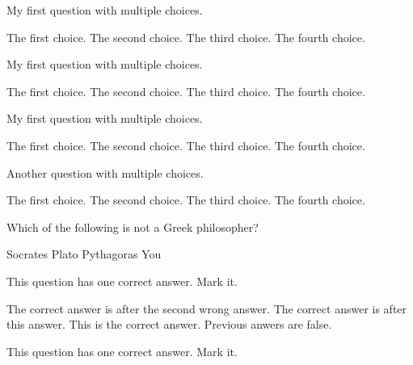 \documentclass{exam}
\begin{document}
\begin{questions}

\question My first question with multiple choices.

\begin{choices}
   \choice The first choice.
   \choice The second choice.
   \choice The third choice.
   \choice The fourth choice.
\end{choices}

\question My first question with multiple choices.

  \begin{oneparchoices}
    \choice The first choice.
    \choice The second choice.
    \choice The third choice.
    \choice The fourth choice.
  \end{oneparchoices}


  \question My first question with multiple choices.
\begin{checkboxes}
    \choice The first choice.
    \choice The second choice.
    \choice The third choice.
    \choice The fourth choice.
\end{checkboxes}


\question Another question with multiple choices.

\begin{oneparcheckboxes}
    \choice The first choice.
    \choice The second choice.
    \choice The third choice.
    \choice The fourth choice.
\end{oneparcheckboxes}

 \checkboxchar{$\Box$}
 \checkedchar{$\blacksquare$}
 \question Which of the following is not a Greek philosopher?

        \begin{oneparcheckboxes}
            \choice Socrates
            \choice Plato
            \choice Pythagoras
            \CorrectChoice You
        \end{oneparcheckboxes}



\question This question has one correct answer. Mark it.

  \begin{checkboxes}
    \choice The correct answer is after the second wrong answer.
    \choice The correct answer is after this answer.
    \choice This is the correct answer.
    \CorrectChoice Previous anwers are false.
   \end{checkboxes}
   \printanswers

   \question This question has one correct answer. Mark it.


\end{questions}
\end{document}
